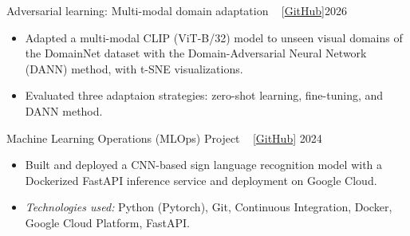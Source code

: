 \begin{projects}
    \project
	{Adversarial learning: Multi-modal domain adaptation  ~ [\href{https://github.com/DileepV17/Applied-Deeplearning}{GitHub}]}{2026}
    {\vspace{-4mm}}
	{\begin{itemize}
     \item Adapted a multi-modal CLIP (ViT-B/32) model to unseen visual domains of the DomainNet dataset with the
     Domain-Adversarial Neural Network (DANN) method,  with t-SNE visualizations.
     \item Evaluated three adaptaion strategies: zero-shot learning, fine-tuning, and DANN method.
     \end{itemize}}
    

\project
	{Machine Learning Operations (MLOps) Project  ~ [\href{https://github.com/anjalisarawgi/mlops_sign_mnist}{GitHub}] }{2024}
    {\vspace{-4mm}}
	{\begin{itemize}
     \item Built and deployed a CNN-based sign language recognition model with a Dockerized FastAPI inference service and
     deployment on Google Cloud.
     \item \textit{Technologies used:} Python (Pytorch), Git, Continuous Integration, Docker, Google Cloud Platform, FastAPI.
     \end{itemize}}
     

\end{projects}

\vspace{-3mm}
